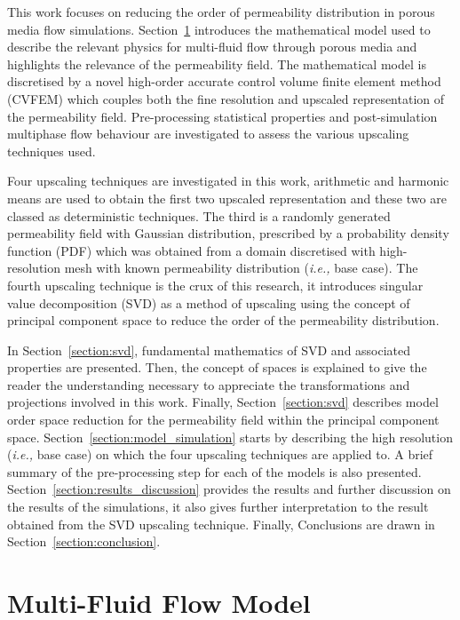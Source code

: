 \documentclass[preprint,12pt]{elsarticle}
\newcommand{\ie}{{\it i.e., }}
\begin{document}
\bigskip
This work focuses on reducing the order of permeability distribution in porous media flow simulations. Section~\ref{section:mathematical_model} introduces the mathematical model used to describe the relevant physics for multi-fluid flow through porous media and highlights the relevance of the permeability field. The mathematical model is discretised by a novel high-order accurate control volume finite element method (CVFEM) \cite{Gomes_2017} which couples both the fine resolution and upscaled representation of the permeability field. Pre-processing statistical properties and post-simulation multiphase flow behaviour are investigated to assess the various upscaling techniques used.

Four upscaling techniques are investigated in this work, arithmetic and harmonic means are used to obtain the first two upscaled representation and these two are classed as deterministic techniques. The third is a randomly generated permeability field with Gaussian distribution, prescribed by a probability density function (PDF) which was obtained from a domain discretised with high-resolution mesh with known permeability distribution (\ie base case). The fourth upscaling technique is the crux of this research, it introduces singular value decomposition (SVD) as a method of upscaling using the concept of principal component space to reduce the order of the permeability distribution.

In Section~\ref{section:svd}, fundamental mathematics of SVD and associated properties are presented. Then, the concept of spaces is explained to give the reader the understanding necessary to appreciate the transformations and projections involved in this work. Finally, Section~\ref{section:svd} describes model order space reduction for the permeability field within the principal component space. Section~\ref{section:model_simulation} starts by describing the high resolution (\ie base case) on which the four upscaling techniques are applied to. A brief summary of the pre-processing step for each of the models is also presented. Section~\ref{section:results_discussion} provides the results and further discussion on the results of the simulations, it also gives further interpretation to the result obtained from the SVD upscaling technique. Finally, Conclusions are drawn in Section~\ref{section:conclusion}.

\section{Multi-Fluid Flow Model}\label{section:mathematical_model}
\end{document}
